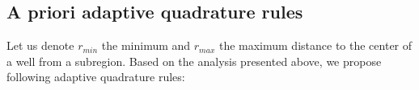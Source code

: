 \documentclass{elsarticle}
\def\vc#1{\mathbf{\boldsymbol{#1}}}     %
\def\d{\mathrm{d}}
\newcommand{\noteJB}[1]{{\color{Blue} \textbf{JB: } \textit{#1}}}
\begin{document}

\subsection{A priori adaptive quadrature rules}
Let us denote $r_{min}$ the minimum and $r_{max}$ the maximum distance to the center of a well from a subregion. 
Based on the analysis presented above, we propose following adaptive quadrature rules:
\end{document}

